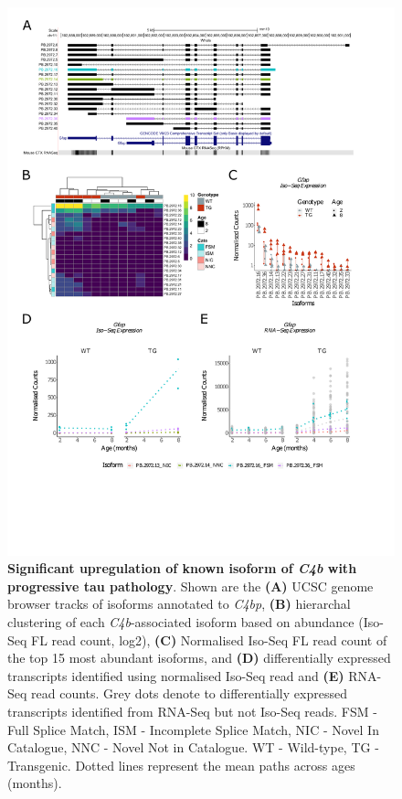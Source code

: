 \begin{figure}[!htp]
	\centering
	\includegraphics[page=2,trim={1.5cm 4.8cm 2cm 1cm}, scale = 0.85]{Figures/Ch5_DiffPlots.pdf}
	\captionsetup{width=0.95\textwidth}
	\caption[Differential Isoform Expression: Changes in transcript expression of isoforms associated with \textit{C4b}]%
	{\textbf{Significant upregulation of known isoform of \textit{C4b} with progressive tau pathology}. Shown are the \textbf{(A)} UCSC genome browser tracks of isoforms annotated to \textit{C4bp}, \textbf{(B)} hierarchal clustering of each \textit{C4b}-associated isoform based on abundance (Iso-Seq FL read count, log2), \textbf{(C)} Normalised Iso-Seq FL read count of the top 15 most abundant isoforms, and \textbf{(D)} differentially expressed transcripts identified using normalised Iso-Seq read and \textbf{(E)} RNA-Seq read counts. Grey dots denote to differentially expressed transcripts identified from RNA-Seq but not Iso-Seq reads. FSM - Full Splice Match, ISM - Incomplete Splice Match, NIC - Novel In Catalogue, NNC - Novel Not in Catalogue. WT - Wild-type, TG - Transgenic. Dotted lines represent the mean paths across ages (months).}   
	\label{fig:DEI_c4b}
\end{figure}

